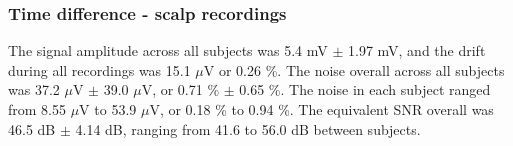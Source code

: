 
\subsubsection{Time difference - scalp recordings}
The signal amplitude across all subjects was 5.4 mV $\pm$ 1.97 mV, and the drift during all recordings was 15.1 $\mu$V or 0.26 \%. The noise overall across all subjects was 37.2 $\mu$V $\pm$ 39.0 $\mu$V, or 0.71 \% $\pm$ 0.65 \%. The noise in each subject ranged from 8.55 $\mu$V to 53.9 $\mu$V, or 0.18 \% to 0.94 \%. The equivalent SNR overall was 46.5 dB $\pm$ 4.14 dB, ranging from 41.6 to 56.0 dB between subjects. 
 
